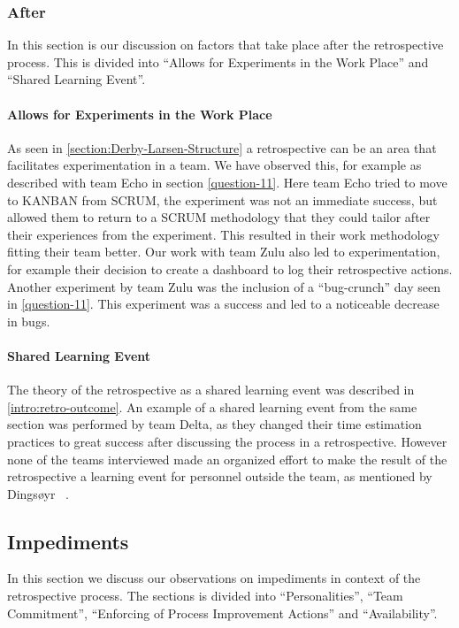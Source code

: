 \subsubsection{After}
In this section is our discussion on factors that take place after the retrospective process. This is divided into ``Allows for Experiments in the Work Place'' and ``Shared Learning Event''. 

\paragraph{Allows for Experiments in the Work Place}
\label{section:experiments-in-work-place}
As seen in \autoref{section:Derby-Larsen-Structure} a retrospective can be an area that facilitates experimentation in a team. We have observed this, for example as described with team Echo in section \autoref{question-11}. Here team Echo tried to move to KANBAN from SCRUM, the experiment was not an immediate success, but allowed them to return to a SCRUM methodology that they could tailor after their experiences from the experiment. This resulted in their work methodology fitting their team better. Our work with team Zulu also led to experimentation, for example their decision to create a dashboard to log their retrospective actions. Another experiment by team Zulu was the inclusion of a ``bug-crunch'' day seen in \autoref{question-11}. This experiment was a success and led to a noticeable decrease in bugs.

\paragraph{Shared Learning Event}
The theory of the retrospective as a shared learning event was described in \autoref{intro:retro-outcome}.  An example of a shared learning event from the same section was performed by team Delta, as they changed their time estimation practices to great success after discussing the process in a retrospective. However none of the teams interviewed made an organized effort to make the result of the retrospective a learning event for personnel outside the team, as mentioned by Dingsøyr ~\cite{Dingsoyr2004}.



\subsection{Impediments}
In this section we discuss our observations on impediments in context of the retrospective process. The sections is divided into ``Personalities'', ``Team Commitment'', ``Enforcing of Process Improvement Actions'' and ``Availability''.

